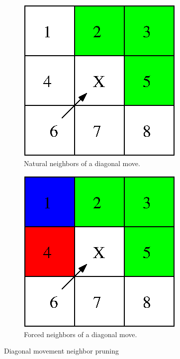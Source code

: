 \documentclass[12pt]{article}
\begin{document}
\begin{figure}
  \begin{subfigure}[b]{.5\linewidth}
    \caption{Natural neighbors of a diagonal move.}\label{dm:1}
    \includegraphics[scale=1]{figures/diag_movement_1.eps}
  \end{subfigure}
  \begin{subfigure}[b]{.5\linewidth}
    \caption{Forced neighbors of a diagonal move.}\label{dm:2}
    \includegraphics[scale=1]{figures/diag_movement_2.eps}
  \end{subfigure}
  \caption{Diagonal movement neighbor pruning}\label{dm}
\end{figure}
\end{document}
